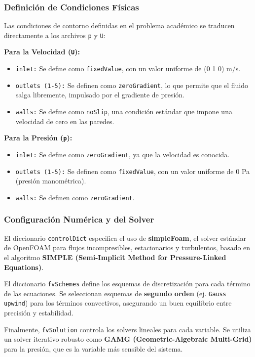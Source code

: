 \documentclass[11pt, a4paper,oneside]{article}
\begin{document}
\subsubsection{Definición de Condiciones Físicas}
Las condiciones de contorno definidas en el problema académico se traducen directamente a los archivos \texttt{p} y \texttt{U}:

\textbf{Para la Velocidad (\texttt{U}):}
\begin{itemize}
    \itemsep0em
    \item \texttt{inlet:} Se define como \texttt{fixedValue}, con un valor uniforme de (0 1 0) m/s.
    \item \texttt{outlets (1-5):} Se definen como \texttt{zeroGradient}, lo que permite que el fluido salga libremente, impulsado por el gradiente de presión.
    \item \texttt{walls:} Se define como \texttt{noSlip}, una condición estándar que impone una velocidad de cero en las paredes.
\end{itemize}

\textbf{Para la Presión (\texttt{p}):}
\begin{itemize}
    \itemsep0em
    \item \texttt{inlet:} Se define como \texttt{zeroGradient}, ya que la velocidad es conocida.
    \item \texttt{outlets (1-5):} Se definen como \texttt{fixedValue}, con un valor uniforme de 0 Pa (presión manométrica).
    \item \texttt{walls:} Se definen como \texttt{zeroGradient}.
\end{itemize}

\subsubsection{Configuración Numérica y del Solver}
El diccionario \texttt{controlDict} especifica el uso de \textbf{simpleFoam}, el solver estándar de OpenFOAM para flujos incompresibles, estacionarios y turbulentos, basado en el algoritmo \textbf{SIMPLE (Semi-Implicit Method for Pressure-Linked Equations)}.

El diccionario \texttt{fvSchemes} define los esquemas de discretización para cada término de las ecuaciones. Se seleccionan esquemas de \textbf{segundo orden} (ej. \texttt{Gauss upwind}) para los términos convectivos, asegurando un buen equilibrio entre precisión y estabilidad.

Finalmente, \texttt{fvSolution} controla los solvers lineales para cada variable. Se utiliza un solver iterativo robusto como \textbf{GAMG (Geometric-Algebraic Multi-Grid)} para la presión, que es la variable más sensible del sistema.
\end{document}
